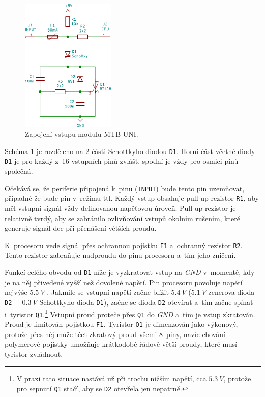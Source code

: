 \begin{figure}[ht]
\includegraphics[width=0.4\textwidth]{data/uni-input/uni-input.pdf}
\caption{Zapojení vstupu modulu MTB-UNI.}
\label{fig:mtbuni-input}
\end{figure}

Schéma \ref{fig:mtbuni-input} je rozděleno na 2 části Schottkyho diodou
\texttt{D1}. Horní část včetně diody \texttt{D1} je pro každý z~16 vstupních
pinů zvlášť, spodní je vždy pro osmici pinů společná.

Očekává se, že periferie připojená k~pinu (\texttt{INPUT}) bude tento pin
uzemňovat, případně že bude pin v~režimu \gls{ttl}. Každý vstup obsahuje
pull-up rezistor \texttt{R1}, aby měl vstupní signál vždy definovanou napěťovou
úroveň. Pull-up rezistor je relativně tvrdý, aby se zabránilo ovlivňování
vstupů okolním rušením, které generuje signál \gls{dcc} při přenášení větších
proudů.

K~procesoru vede signál přes ochrannou pojistku \texttt{F1} a~ochranný rezistor
\texttt{R2}. Tento rezistor zabraňuje nadproudu do pinu procesoru a~tím jeho
zničení.

Funkcí celého obvodu od \texttt{D1} níže je vyzkratovat vstup na \textit{GND} v~momentě,
kdy je na něj přivedené vyšší než dovolené napětí. Pin procesoru povoluje
napětí nejvýše $5.5~V$ \cite{atmega128a-datasheet}. Jakmile se vstupní napětí
začne blížit $5.4~V$ ($5.1~V$ zenerova dioda \texttt{D2} + $0.3~V$ Schottkyho
dioda \texttt{D1}), začne se dioda \texttt{D2} otevírat a~tím začne spínat
i~tyristor \texttt{Q1}.\footnote{V praxi tato situace nastává už při trochu
nižším napětí, cca $5.3~V$, protože pro sepnutí \texttt{Q1} stačí, aby se
\texttt{D2} otevřela jen nepatrně.} Vstupní proud proteče přes \texttt{Q1} do
\textit{GND} a~tím je vstup zkratován. Proud je limitován pojistkou \texttt{F1}.
Tyristor \texttt{Q1} je dimenzován jako výkonový, protože přes něj může téct zkratový
proud všemi 8~piny, navíc chování polymerové pojistky umožňuje krátkodobé řádově
větší proudy, které musí tyristor zvládnout.


